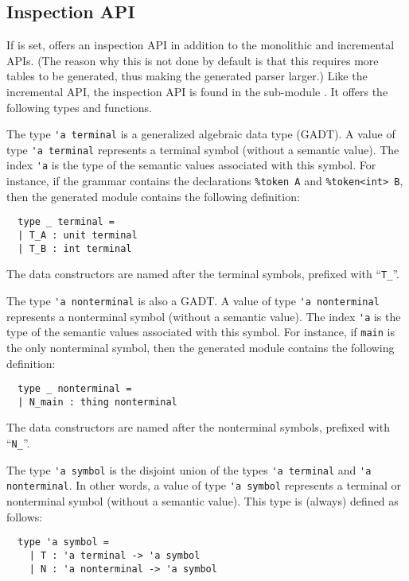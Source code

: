 \documentclass[onecolumn,11pt,nocopyrightspace,preprint]{sigplanconf}
\begin{document}
\subsection{Inspection API}
\label{sec:inspection}

If \oinspection is set, \menhir offers an inspection API in addition to the
monolithic and incremental APIs. (The reason why this is not done by default
is that this requires more tables to be generated, thus making the generated
parser larger.) Like the incremental API, the inspection API is found in the
sub-module \menhirinterpreter. It offers the following types and functions.


The type \verb+'a terminal+ is a generalized algebraic data type (GADT). A
value of type \verb+'a terminal+ represents a terminal symbol (without a
semantic value). The index \verb+'a+ is the type of the semantic values
associated with this symbol. For instance, if the grammar contains the
declarations \verb+%token A+ and \verb+%token<int> B+, then the generated
module \menhirinterpreter contains the following definition:
%
\begin{verbatim}
  type _ terminal =
  | T_A : unit terminal
  | T_B : int terminal
\end{verbatim}
%
The data constructors are named after the terminal symbols, prefixed with ``\verb+T_+''.


The type \verb+'a nonterminal+ is also a GADT. A value of type
\verb+'a nonterminal+ represents a nonterminal symbol (without a semantic value). The
index \verb+'a+ is the type of the semantic values associated with this
symbol. For instance, if \verb+main+ is the only nonterminal symbol,
then the generated
module \menhirinterpreter contains the following definition:
%
\begin{verbatim}
  type _ nonterminal =
  | N_main : thing nonterminal
\end{verbatim}
%
The data constructors are named after the nonterminal symbols, prefixed with ``\verb+N_+''.


The type \verb+'a symbol+
is the disjoint union of the types \verb+'a terminal+ and \verb+'a nonterminal+.
In other words, a value of type \verb+'a symbol+ represents a terminal or nonterminal symbol (without
a semantic value).
This type is (always) defined as follows:
%
\begin{verbatim}
  type 'a symbol =
    | T : 'a terminal -> 'a symbol
    | N : 'a nonterminal -> 'a symbol
\end{verbatim}
\end{document}
